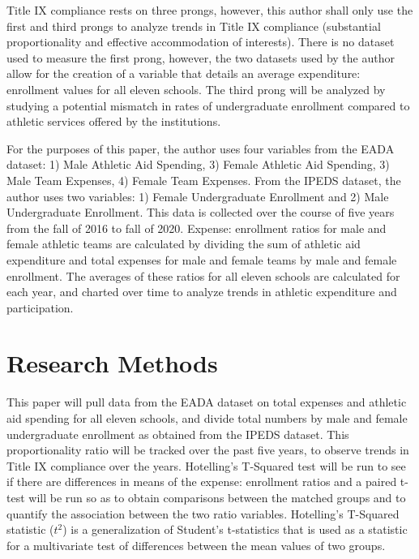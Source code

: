 \documentclass[11pt]{article}
\begin{document}
Title IX compliance rests on three prongs, however, this author shall only use the first and third prongs to analyze trends in Title IX compliance (substantial proportionality and effective accommodation of interests). There is no dataset used to measure the first prong, however, the two datasets used by the author allow for the creation of a variable that details an average expenditure: enrollment values for all eleven schools. The third prong will be analyzed by studying a potential mismatch in  rates of undergraduate enrollment compared to athletic services offered by the institutions. 

For the purposes of this paper, the author uses four variables from the EADA dataset: 1) Male Athletic Aid Spending, 3) Female Athletic Aid Spending, 3) Male Team Expenses, 4) Female Team Expenses. From the IPEDS dataset, the author uses two variables: 1) Female Undergraduate Enrollment and 2) Male Undergraduate Enrollment. This data is collected over the course of five years from the fall of 2016 to fall of 2020. Expense: enrollment ratios for male and female athletic teams are calculated by dividing the sum of athletic aid expenditure and total expenses for male and female teams by male and female enrollment. The averages of these ratios for all eleven schools are calculated for each year, and charted over time to analyze trends in athletic expenditure and participation.

\section{Research Methods}

This paper will pull data from the EADA dataset on total expenses and athletic aid spending for all eleven schools, and divide total numbers by male and female undergraduate enrollment as obtained from the IPEDS dataset. This proportionality ratio will be tracked over the past five years, to observe trends in Title IX compliance over the years. Hotelling's T-Squared test will be run to see if there are differences in means of the expense: enrollment ratios and a paired t-test will be run so as to obtain comparisons between the matched groups and to quantify the association between the two ratio variables. Hotelling's T-Squared statistic ($t^2$) is a generalization of Student's t-statistics that is used as a statistic for a multivariate test of differences between the mean values of two groups. 
\end{document}
